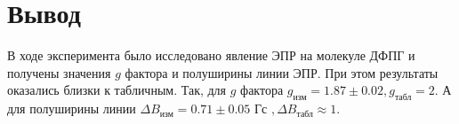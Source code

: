 \documentclass[a4paper,12pt]{article}
\begin{document}
\section {Вывод}
	В ходе эксперимента было исследовано явление ЭПР на молекуле ДФПГ и получены значения $g$ фактора и полуширины линии ЭПР. При этом результаты оказались близки к табличным. Так, для $g$ фактора $g_{\text{изм}} = 1.87\pm 0.02, g_{\text{табл}} = 2 $. А для полуширины линии $\Delta B_{\text{изм}} = 0.71\pm 0.05\text{ Гс }, \Delta B_{\text{табл}}  \approx 1$. 
\end{document}
